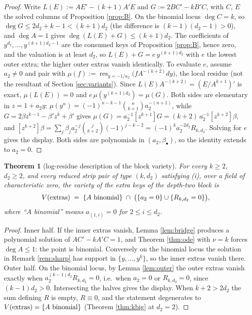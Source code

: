 \documentclass[11pt]{article}
\newtheorem{theorem}{Theorem}[section]
\theoremstyle{definition}
\theoremstyle{remark}
\begin{document}
\begin{proof}
Write $L(E):=AE'-(k+1)A'E$ and $G:=2BC'-kB'C$, with $C$, $E$ the solved columns of Proposition \ref{prop:B}. On the binomial locus $\deg C=k$, so $\deg G\leq 2d_2+k-1<(k+1)d_2$ (the difference is $(k-1)(d_2-1)>0$), and $\deg A=1$ gives $\deg(L(E)+G)\leq(k+1)d_2$. The coefficients of $y^{d_2},\dots,y^{(k+1)d_2-1}$ are the consumed keys of Proposition \ref{prop:B}, hence zero, and the valuation is at least $d_2$, so $L(E)+G=e\,y^{(k+1)d_2}$ with $e$ the lowest outer extra; the higher outer extras vanish identically. To evaluate $e$, assume $a_2\neq0$ and pair with $\mu(f):=\operatorname{res}_{y=-1/a_2}\bigl(fA^{-(k+2)}dy\bigr)$, the local residue (not the resultant of Section \ref{sec:variants}). Since $L(E)A^{-(k+2)}=(E/A^{k+1})'$ is exact, $\mu(L(E))=0$ and $e\,\mu(y^{(k+1)d_2})=\mu(G)$. Both sides are elementary in $z=1+a_2y$: $\mu(y^n)=(-1)^{n-k-1}\binom{n}{k+1}a_2^{-(n+1)}$, while $G=2\beta z^{k-1}-\beta'z^k+\beta'$ gives $\mu(G)=a_2^{-1}[z^{k+1}]G=(k+2)\,a_2^{-1}[z^{k+2}]\beta$, and $[z^{k+2}]\beta=\sum_j\beta_ja_2^{-j}\binom{j}{k+2}(-1)^{j-k-2}=(-1)^ka_2^{-2d_2}R_{k,d_2}$. Solving for $e$ gives the display. Both sides are polynomials in $(a_2,\beta_\bullet)$, so the identity extends to $a_2=0$.
\end{proof}

\begin{theorem}[log-residue description of the block variety]\label{thm:R}
For every $k\geq2$, $d_2\geq2$, and every reduced strip pair of type $(k,d_2)$ satisfying \textup{(i)}, over a field of characteristic zero, the variety of the extra keys of the depth-two block is
\[
V(\textup{extras})\;=\;\{A \textup{ binomial}\}\;\cap\;\bigl(\{a_2=0\}\cup\{R_{k,d_2}=0\}\bigr),
\]
where ``$A$ binomial'' means $a_{(1,i)}=0$ for $2\leq i\leq d_2$.
\end{theorem}

\begin{proof}
Inner half. If the inner extras vanish, Lemma \ref{lem:bridge} produces a polynomial solution of $AC'-kA'C=1$, and Theorem \ref{thm:ode} with $\nu=k$ forces $\deg A\leq1$: the point is binomial. Conversely on the binomial locus the solution in Remark \ref{rem:sharp} has support in $\{y,\dots,y^k\}$, so the inner extras vanish there. Outer half. On the binomial locus, by Lemma \ref{lem:outer} the outer extras vanish exactly when $a_2^{(k-1)d_2}R_{k,d_2}=0$, i.e.\ when $a_2=0$ or $R_{k,d_2}=0$, since $(k-1)d_2>0$. Intersecting the halves gives the display. When $k+2>2d_2$ the sum defining $R$ is empty, $R\equiv0$, and the statement degenerates to $V(\textup{extras})=\{A\textup{ binomial}\}$ (Theorem \ref{thm:kbig} at $d_2=2$).
\end{proof}
\end{document}
